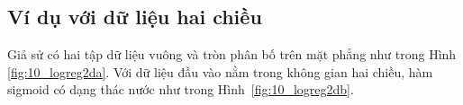 







\subsection{Ví dụ với dữ liệu hai chiều}
Giả sử có hai tập dữ liệu vuông và tròn phân bố trên mặt phẳng như trong Hình \ref{fig:10_logreg2da}. Với dữ liệu đầu vào nằm trong không gian hai chiều, hàm sigmoid có dạng thác nước như trong Hình~\ref{fig:10_logreg2db}.

